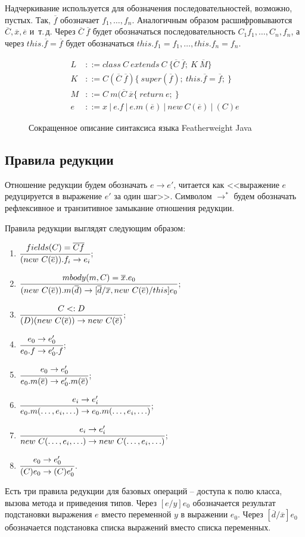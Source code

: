 Надчеркивание используется для обозначения последовательностей, возможно, пустых.
Так, $\overline{f}$ обозначает $f_1, \ldots, f_n$.
Аналогичным образом расшифровываются $\overline{C}, \overline{x}, \overline{e}$ и~т.\,д.
Через $\overline{C}\ \overline{f}$ будет обозначаться последовательность $C_1 f_1, \ldots, C_n, f_n$,
а через $this.\overline{f} = \overline{f}$ будет обозначаться $this.f_1 = f_1, \ldots, this.f_n = f_n$.
\begin{figure}[htb]
    \begin{align*}
        L &::= class\ C\ extends\ C\ \{\overline{C}\ \overline{f};\ K\ \overline{M}\}\\
        K &::= C(\overline{C}\ \overline{f})\{\ super(\overline{f});\ this.\overline{f} = \overline{f};\ \}\\
        M &::= C\ m(\overline{C}\ \overline{x}\{\ return\ e;\ \}\\
        e &::= x\ |\ e.f\ |\ e.m(\overline{e})\ |\ new\ C(\overline{e})\ |\ (C)e
    \end{align*}
    \caption{Сокращенное описание синтаксиса языка Featherweight Java}
    \label{fj-syntax}
\end{figure}
\subsection{Правила редукции}
Отношение редукции будем обозначать $e \rightarrow e'$, читается как <<выражение $e$ редуцируется в выражение $e'$ за один шаг>>.
Символом $\rightarrow^*$ будем обозначать рефлексивное и транзитивное замыкание отношения редукции.

Правила редукции выглядят следующим образом:
\begin{enumerate}
    \item $\cfrac{fields(C) = \overline{C}\overline{f}}{(new\ C(\overline{e})).f_i \rightarrow e_i}$;
    \item $\cfrac{mbody(m, C) = \overline{x}.e_0}{(new\ C(\overline{e})).m(\overline{d}) \rightarrow [\overline{d}/\overline{x}, new\ C(\overline{e})/this]e_0}$;
    \item $\cfrac{C <: D}{(D)(new\ C(\overline{e})) \rightarrow new\ C(\overline{e})}$;
    \item $\cfrac{e_0 \rightarrow e_0'}{e_0.f \rightarrow e_0'.f}$;
    \item $\cfrac{e_0 \rightarrow e_0'}{e_0.m(\overline{e}) \rightarrow e_0'.m(\overline{e})}$;
    \item $\cfrac{e_i \rightarrow e_i'}{e_0.m(\ldots, e_i, \ldots) \rightarrow e_0.m(\ldots, e_i, \ldots)}$;
    \item $\cfrac{e_i \rightarrow e_i'}{new\ C(\ldots, e_i, \ldots) \rightarrow new\ C(\ldots, e_i, \ldots)}$;
    \item $\cfrac{e_0 \rightarrow e_0'}{(C)e_0 \rightarrow (C)e_0'}$.
\end{enumerate}
Есть три правила редукции для базовых операций -- доступа к полю класса, вызова метода и приведения типов.
Через $[e/y]e_0$ обозначается результат подстановки выражения $e$ вместо переменной $y$ в выражении $e_0$.
Через $[\overline{d}/\overline{x}]e_0$ обозначается подстановка списка выражений вместо списка переменных.
